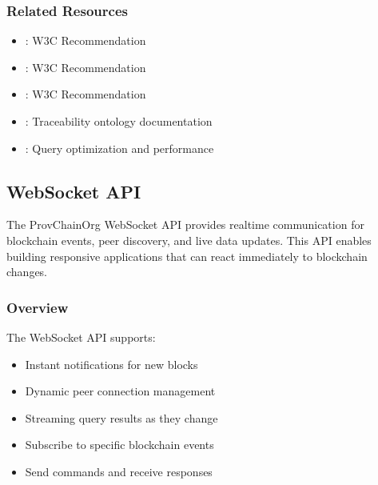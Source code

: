 \documentclass[letterpaper,10pt,english]{sphinxmanual}
\begin{document}
\subsubsection{Related Resources}
\label{\detokenize{api/sparql-api:related-resources}}\begin{itemize}
\item {} 
\sphinxAtStartPar
{}: W3C Recommendation

\item {} 
\sphinxAtStartPar
{}: W3C Recommendation

\item {} 
\sphinxAtStartPar
{}: W3C Recommendation

\item {} 
\sphinxAtStartPar
{}: Traceability ontology documentation

\item {} 
\sphinxAtStartPar
{}: Query optimization and performance

\end{itemize}

\sphinxstepscope


\subsection{WebSocket API}
\label{\detokenize{api/websocket-api:websocket-api}}\label{\detokenize{api/websocket-api::doc}}
\sphinxAtStartPar
The ProvChainOrg WebSocket API provides real\sphinxhyphen{}time communication for blockchain events, peer discovery, and live data updates. This API enables building responsive applications that can react immediately to blockchain changes.


\subsubsection{Overview}
\label{\detokenize{api/websocket-api:overview}}
\sphinxAtStartPar
The WebSocket API supports:
\begin{itemize}
\item {} 
\sphinxAtStartPar
{} \sphinxhyphen{} Instant notifications for new blocks

\item {} 
\sphinxAtStartPar
{} \sphinxhyphen{} Dynamic peer connection management

\item {} 
\sphinxAtStartPar
{} \sphinxhyphen{} Streaming query results as they change

\item {} 
\sphinxAtStartPar
{} \sphinxhyphen{} Subscribe to specific blockchain events

\item {} 
\sphinxAtStartPar
{} \sphinxhyphen{} Send commands and receive responses

\end{itemize}
\end{document}
